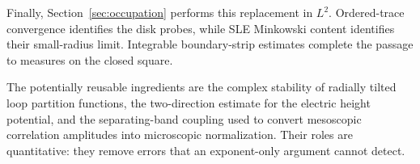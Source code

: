 Finally, Section~\ref{sec:occupation} performs this replacement in
$L^2$. Ordered-trace convergence identifies the disk probes, while
SLE Minkowski content identifies their small-radius limit. Integrable
boundary-strip estimates complete the passage to measures on the
closed square.

The potentially reusable ingredients are the complex stability of
radially tilted loop partition functions, the two-direction estimate
for the electric height potential, and the separating-band coupling
used to convert mesoscopic correlation amplitudes into microscopic
normalization. Their roles are quantitative: they remove errors that
an exponent-only argument cannot detect.
